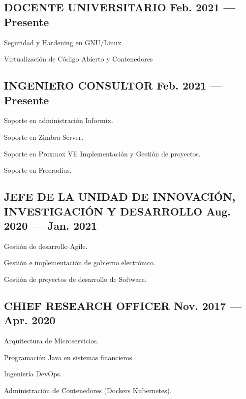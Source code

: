 \documentclass[letter,10pt]{article}
\begin{document}
\subsection{{DOCENTE UNIVERSITARIO \hfill Feb. 2021 --- Presente}}
\begin{zitemize}
\item   Seguridad y Hardening en GNU/Linux
\item	Virtualización de Código Abierto y Contenedores
\end{zitemize}
\vspace*{2mm}

\subsection{{INGENIERO CONSULTOR \hfill Feb. 2021 --- Presente}}
\begin{zitemize}
\item	Soporte en administración Informix.
\item	Soporte en Zimbra Server.
\item	Soporte en Proxmox VE Implementación y Gestión de proyectos.
\item	Soporte en Freeradius. 
\end{zitemize}
\vspace*{2mm}
\subsection{{JEFE DE LA UNIDAD DE INNOVACIÓN, INVESTIGACIÓN Y DESARROLLO \hfill Aug. 2020 --- Jan. 2021}}
\begin{zitemize}
\item Gestión de desarrollo Agile.
\item Gestión e implementación de gobierno electrónico.
\item Gestión de proyectos de desarrollo de Software.
\end{zitemize}
\vspace*{2mm}
\subsection{{CHIEF RESEARCH OFFICER \hfill Nov. 2017 --- Apr. 2020}}
\begin{zitemize}
\item Arquitectura de Microservicios.
\item Programación Java en sistemas financieros.
\item Ingeniería DevOps. 
\item Administración de Contenedores (Dockers Kubernetes).   
\end{zitemize}
\vspace*{2mm}
\end{document}
